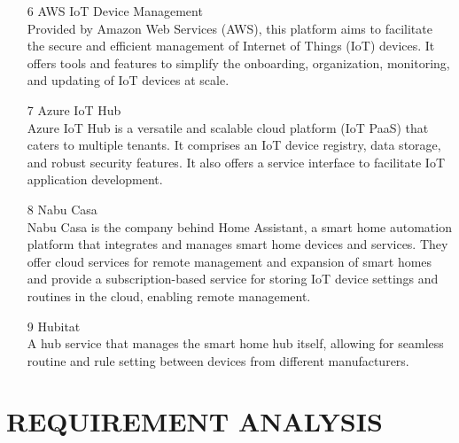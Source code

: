 \documentclass[conference]{IEEEtran}
\begin{document}
\begin{itemize}
\\
\item [6]AWS IoT Device Management\\
Provided by Amazon Web Services (AWS), this platform aims to facilitate the secure and efficient management of Internet of Things (IoT) devices. It offers tools and features to simplify the onboarding, organization, monitoring, and updating of IoT devices at scale.
\\
\item [7]Azure IoT Hub\\
Azure IoT Hub is a versatile and scalable cloud platform (IoT PaaS) that caters to multiple tenants. It comprises an IoT device registry, data storage, and robust security features. It also offers a service interface to facilitate IoT application development.
\\
\item [8]Nabu Casa\\
Nabu Casa is the company behind Home Assistant, a smart home automation platform that integrates and manages smart home devices and services. They offer cloud services for remote management and expansion of smart homes and provide a subscription-based service for storing IoT device settings and routines in the cloud, enabling remote management.
\\
\item [9]Hubitat\\
A hub service that manages the smart home hub itself, allowing for seamless routine and rule setting between devices from different manufacturers.
\\
\end{itemize}



\section{REQUIREMENT ANALYSIS}
\end{document}
